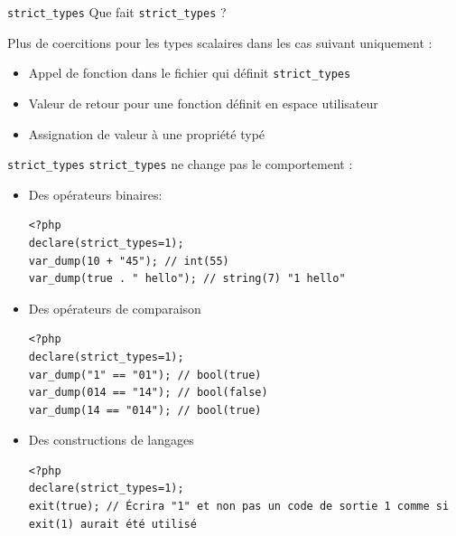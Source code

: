 \documentclass[10pt]{beamer}
\begin{document}
\begin{frame}[fragile]{\texttt{strict\_types}}
    Que fait \texttt{strict\_types} ?
    \pause
    
    Plus de coercitions pour les types scalaires dans les cas suivant \alert{uniquement} :
    \begin{itemize}
        \item Appel de fonction dans le fichier qui définit \texttt{strict\_types}
        \item Valeur de retour pour une fonction définit en espace utilisateur
        \item Assignation de valeur à une propriété typé
    \end{itemize}
\end{frame}
\begin{frame}[fragile]{\texttt{strict\_types}}
    \texttt{strict\_types} ne change \alert{pas} le comportement :

    \begin{itemize}
        \item Des opérateurs binaires:
            \begin{verbatim}
<?php
declare(strict_types=1);
var_dump(10 + "45"); // int(55)
var_dump(true . " hello"); // string(7) "1 hello"
            \end{verbatim}
        \item Des opérateurs de comparaison
            \begin{verbatim}
<?php
declare(strict_types=1);
var_dump("1" == "01"); // bool(true)
var_dump(014 == "14"); // bool(false)
var_dump(14 == "014"); // bool(true)
            \end{verbatim}
        \item Des constructions de langages
            \begin{verbatim}
<?php
declare(strict_types=1);
exit(true); // Écrira "1" et non pas un code de sortie 1 comme si exit(1) aurait été utilisé
            \end{verbatim}
    \end{itemize}
\end{frame}
\end{document}
